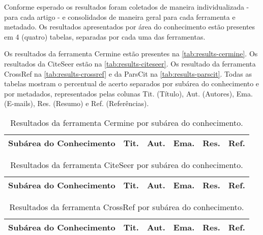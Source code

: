 
Conforme esperado os resultados foram coletados de maneira individualizada - para cada artigo - e consolidados de maneira geral para cada ferramenta e metadado. Os resultados apresentados por área do conhecimento estão presentes em 4 (quatro) tabelas, separadas por cada uma das ferramentas. 

Os resultados da ferramenta Cermine estão presentes na \autoref{tab:results-cermine}. Os resultados da CiteSeer estão na \autoref{tab:results-citeseer}. Os resultado da ferramenta CrossRef na \autoref{tab:results-crossref} e da ParsCit na \autoref{tab:results-parscit}. Todas as tabelas mostram o percentual de acerto separados por subárea do conhecimento e por metadados, representados pelas colunas Tit. (Título),  Aut. (Autores), Ema. (E-mails), Res. (Resumo) e Ref. (Referências).

\begin{table}
    \caption{Resultados da ferramenta Cermine por subárea do conhecimento.}
    \begin{center}
        \begin{tabular}{|p{6cm}|C{1.2cm}|C{1.2cm}|C{1.2cm}|C{1.2cm}|C{1.2cm}|}
            \hline 
            \textbf{Subárea do Conhecimento} & \textbf{Tit.} & \textbf{Aut.} & \textbf{Ema.} & \textbf{Res.} & \textbf{Ref.} \\ \hline 
            
        \end{tabular}
    \end{center}
    \label{tab:results-cermine}
\end{table}

\begin{table}
    \caption{Resultados da ferramenta CiteSeer por subárea do conhecimento.}
    \begin{center}
        \begin{tabular}{|p{6cm}|C{1.2cm}|C{1.2cm}|C{1.2cm}|C{1.2cm}|C{1.2cm}|}
            \hline 
            \textbf{Subárea do Conhecimento} & \textbf{Tit.} & \textbf{Aut.} & \textbf{Ema.} & \textbf{Res.} & \textbf{Ref.} \\ \hline 
            
        \end{tabular}
    \end{center}
    \label{tab:results-citeseer}
\end{table}

\begin{table}
    \caption{Resultados da ferramenta CrossRef por subárea do conhecimento.}
    \begin{center}
        \begin{tabular}{|p{6cm}|C{1.2cm}|C{1.2cm}|C{1.2cm}|C{1.2cm}|C{1.2cm}|}
            \hline 
            \textbf{Subárea do Conhecimento} & \textbf{Tit.} & \textbf{Aut.} & \textbf{Ema.} & \textbf{Res.} & \textbf{Ref.} \\ \hline 
            
        \end{tabular}
    \end{center}
    \label{tab:results-crossref}
\end{table}

